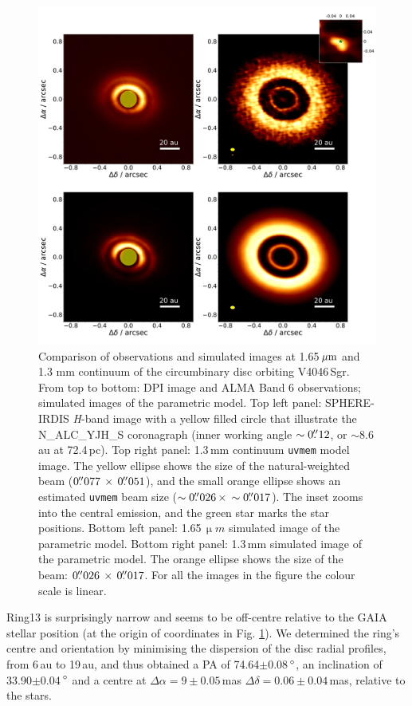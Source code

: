 \documentclass[letters,usenatbib,times]{mnras}
\begin{document}
\begin{figure}
  \includegraphics[width=\textwidth]{hot_two_E.pdf}
  \caption{Comparison of observations and simulated images at 1.65\,$\hbox{$\mu$m}$ and 1.3 mm continuum of the circumbinary disc orbiting V4046\,Sgr. From top to bottom: DPI image and ALMA Band 6 observations; simulated images of the parametric model. Top left panel: SPHERE-IRDIS \textit{H}-band image with a yellow filled circle that illustrate the N\_ALC\_YJH\_S coronagraph (inner working angle $\sim0\hbox{$.\!\!^{\prime\prime}$}12$, or $\sim$8.6\,au at 72.4\,pc). Top right panel: 1.3\,mm continuum {\tt uvmem} model image. The yellow ellipse shows the size of the natural-weighted beam ($ 0\hbox{$.\!\!^{\prime\prime}$}077 \, \times \, 0\hbox{$.\!\!^{\prime\prime}$}051$), and the small orange ellipse shows an estimated {\tt uvmem} beam size ($\sim0\hbox{$.\!\!^{\prime\prime}$}026 \, \times \, \sim0\hbox{$.\!\!^{\prime\prime}$}017$). The inset zooms into the central emission, and the green star marks the star positions. Bottom left panel: 1.65\,$\upmu m$ simulated image of the parametric model. Bottom right panel: 1.3\,mm simulated image of the parametric model. The orange ellipse shows the size of the beam: $0\hbox{$.\!\!^{\prime\prime}$}026 \, \times \, 0\hbox{$.\!\!^{\prime\prime}$}017$. For all the images in the figure the colour scale is linear.}
  \label{fig:two}
\end{figure}

Ring13 is surprisingly narrow and seems to be off-centre relative to the GAIA stellar position (at the origin of coordinates in Fig. \ref{fig:two}). We determined the ring's centre and orientation by minimising the dispersion of the disc radial profiles, from 6\,au to 19\,au, and thus obtained a PA of 74.64$\pm$0.08\,$\hbox{$^\circ$}$, an inclination of 33.90$\pm$0.04\,$\hbox{$^\circ$}$ and a centre at $\Delta \alpha = 9\pm0.05$\,mas $\Delta \delta = 0.06\pm0.04$\,mas, relative to the stars.
\end{document}

